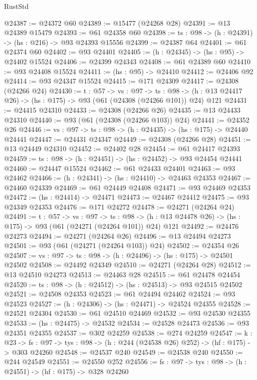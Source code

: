 \begin{lexlean}{RustStd}
\begin{coremodule}
@24387 := @24372 @60
@24389 := @15477 (@24268 @28)
@24391 := @13 @24389 @15479
@24393 := @61 @24358 @60
@24398 := {ts : @98} -> (h : @24391) -> (hs : @216) -> @93 @24393 @15556
@24399 := @24387 @64
@24401 := @61 @24374 @60
@24402 := @93 @24401
@24405 := (h : @24345) -> (hs : @95) -> @24402 @15524
@24406 := @24399 @24343
@24408 := @61 @24389 @60
@24410 := @93 @24408 @15524
@24411 := (hs : @95) -> @24410
@24412 := @24406 @92
@24414 := @93 @24347 @15524
@24415 := @171 @24309
@24417 := @24308 (@24266 @24)
@24430 := {t : @57} ->
  {vs : @97} ->
  {ts : @98} -> (h : @13 @24417 @26) -> (hs : @175) -> @93 (@61 (@24308 (@24266 @101)) @24) @121
@24431 := @24415 @24310
@24433 := @24308 (@24266 @26)
@24435 := @13 @24433 @24310
@24440 := @93 (@61 (@24308 (@24266 @103)) @24)
@24441 := @24352 @26
@24446 := {vs : @97} -> {ts : @98} -> (h : @24435) -> (hs : @175) -> @24440 @24441
@24447 := @24431 @24347
@24449 := @24308 (@24266 @28)
@24451 := @13 @24449 @24310
@24452 := @24402 @28
@24454 := @61 @24417 @24393
@24459 := {ts : @98} -> (h : @24451) -> (hs : @24452) -> @93 @24454 @24441
@24460 := @24447 @15524
@24462 := @61 @24433 @24401
@24463 := @93 @24462
@24466 := (h : @24341) -> (hs : @24410) -> @24463 @24353
@24467 := @24460 @24339
@24469 := @61 @24449 @24408
@24471 := @93 @24469 @24353
@24472 := (hs : @24414) -> @24471
@24473 := @24467 @24412
@24475 := @93 @24349 @24353
@24476 := @171 @24272
@24478 := @24271 (@24264 @24)
@24491 := {t : @57} ->
  {vs : @97} ->
  {ts : @98} -> (h : @13 @24478 @26) -> (hs : @175) -> @93 (@61 (@24271 (@24264 @101)) @24) @121
@24492 := @24476 @24273
@24494 := @24271 (@24264 @26)
@24496 := @13 @24494 @24273
@24501 := @93 (@61 (@24271 (@24264 @103)) @24)
@24502 := @24354 @26
@24507 := {vs : @97} -> {ts : @98} -> (h : @24496) -> (hs : @175) -> @24501 @24502
@24508 := @24492 @24349
@24510 := @24271 (@24264 @28)
@24512 := @13 @24510 @24273
@24513 := @24463 @28
@24515 := @61 @24478 @24454
@24520 := {ts : @98} -> (h : @24512) -> (hs : @24513) -> @93 @24515 @24502
@24521 := @24508 @24353
@24523 := @61 @24494 @24462
@24524 := @93 @24523
@24527 := (h : @24306) -> (hs : @24471) -> @24524 @24355
@24528 := @24521 @24304
@24530 := @61 @24510 @24469
@24532 := @93 @24530 @24355
@24533 := (hs : @24475) -> @24532
@24534 := @24528 @24473
@24536 := @93 @24351 @24355
@24537 := @302 @24259
@24538 := @274 @24259
@24547 := {k : @23} ->
  {fs : @97} -> {tys : @98} -> (h : @244 (@24538 @26) @252) -> (hf : @175) -> @303 @24260
@24548 := @24537 @240
@24549 := @24538 @240
@24550 := @244 @24549
@24551 := @24550 @252
@24556 := {fs : @97} -> {tys : @98} -> (h : @24551) -> (hf : @175) -> @328 @24260

\end{coremodule}
\end{lexlean}
